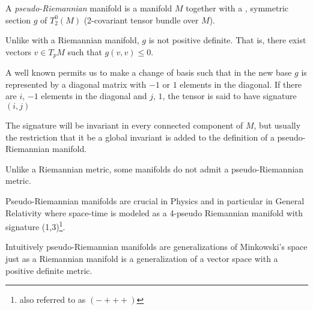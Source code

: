 \documentclass[12pt]{article}
\begin{document}
A \emph{pseudo-Riemannian} manifold is a manifold $M$ together with a , symmetric section $g$ of $T^0_{2}(M)$ (2-covariant tensor bundle over $M$).

Unlike with a Riemannian manifold, $g$ is not positive definite. That is, there exist vectors $v\in T_{p}M$ such that $g(v,v)\le0$.

A well known  permits us to make a change of basis such that in the new base $g$ is represented by a diagonal matrix with $-1$ or $1$ elements in the diagonal. If there are $i$, $-1$ elements in the diagonal and $j$, $1$, the tensor is said to have signature $(i,j)$

The signature will be invariant in every connected component of $M$, but usually the restriction that it be a global invariant is added to the definition of a pseudo-Riemannian manifold.

Unlike a Riemannian metric, some manifolds do not admit a pseudo-Riemannian metric.

Pseudo-Riemannian manifolds are crucial in Physics and in particular in General Relativity where space-time is modeled as a 4-pseudo Riemannian manifold with signature (1,3)\footnote{also referred to as $(-+++)$}.

Intuitively pseudo-Riemannian manifolds are generalizations of Minkowski's space just as a Riemannian manifold is a generalization of a vector space with a positive definite metric.
\end{document}
